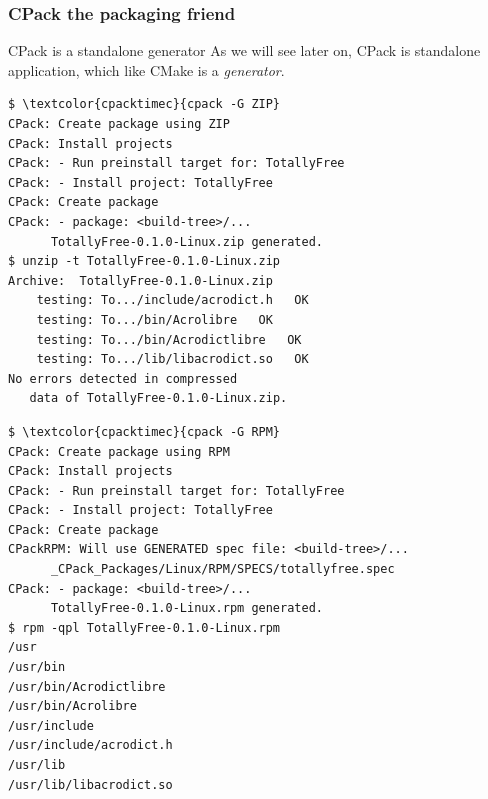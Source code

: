 \documentclass[compress,slidestop,table
              ]
               {beamer}
\begin{document}
\begin{frame}[fragile]
\frametitle{CPack the packaging friend}
\begin{block}{CPack is a standalone generator}
As we will see later on, CPack is standalone application,
which like CMake is a \emph{generator}.
\end{block}
\vspace*{-0.5cm}
\begin{multicols}{2}
\begin{Verbatim}[commandchars=\\\{\},fontsize=\tiny]
$ \textcolor{cpacktimec}{cpack -G ZIP}
CPack: Create package using ZIP
CPack: Install projects
CPack: - Run preinstall target for: TotallyFree
CPack: - Install project: TotallyFree
CPack: Create package
CPack: - package: <build-tree>/...
      TotallyFree-0.1.0-Linux.zip generated.
$ unzip -t TotallyFree-0.1.0-Linux.zip
Archive:  TotallyFree-0.1.0-Linux.zip
    testing: To.../include/acrodict.h   OK
    testing: To.../bin/Acrolibre   OK
    testing: To.../bin/Acrodictlibre   OK
    testing: To.../lib/libacrodict.so   OK
No errors detected in compressed
   data of TotallyFree-0.1.0-Linux.zip.
\end{Verbatim}
\columnbreak
\begin{Verbatim}[commandchars=\\\{\},fontsize=\tiny]
$ \textcolor{cpacktimec}{cpack -G RPM}
CPack: Create package using RPM
CPack: Install projects
CPack: - Run preinstall target for: TotallyFree
CPack: - Install project: TotallyFree
CPack: Create package
CPackRPM: Will use GENERATED spec file: <build-tree>/...
      _CPack_Packages/Linux/RPM/SPECS/totallyfree.spec
CPack: - package: <build-tree>/...
      TotallyFree-0.1.0-Linux.rpm generated.
$ rpm -qpl TotallyFree-0.1.0-Linux.rpm 
/usr
/usr/bin
/usr/bin/Acrodictlibre
/usr/bin/Acrolibre
/usr/include
/usr/include/acrodict.h
/usr/lib
/usr/lib/libacrodict.so
\end{Verbatim}
\end{multicols}
\end{frame}
\end{document}
